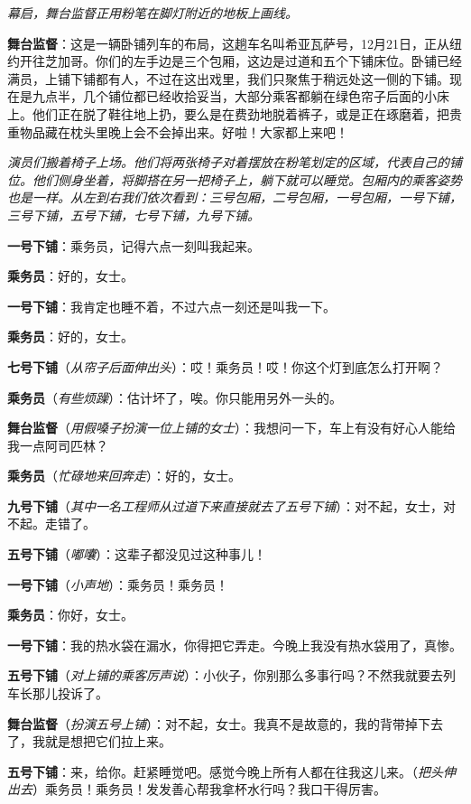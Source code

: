 \documentclass[lang=cn,newtx,12pt,scheme=chinese]{elegantbook}
\begin{document}
\textit{幕启，舞台监督正用粉笔在脚灯附近的地板上画线。}

\textbf{舞台监督}：这是一辆卧铺列车的布局，这趟车名叫希亚瓦萨号，12月21日，正从纽约开往芝加哥。你们的左手边是三个包厢，这边是过道和五个下铺床位。卧铺已经满员，上铺下铺都有人，不过在这出戏里，我们只聚焦于稍远处这一侧的下铺。现在是九点半，几个铺位都已经收拾妥当，大部分乘客都躺在绿色帘子后面的小床上。他们正在脱了鞋往地上扔，要么是在费劲地脱着裤子，或是正在琢磨着，把贵重物品藏在枕头里晚上会不会掉出来。好啦！大家都上来吧！

\textit{演员们搬着椅子上场。他们将两张椅子对着摆放在粉笔划定的区域，代表自己的铺位。他们侧身坐着，将脚搭在另一把椅子上，躺下就可以睡觉。包厢内的乘客姿势也是一样。从左到右我们依次看到：三号包厢，二号包厢，一号包厢，一号下铺，三号下铺，五号下铺，七号下铺，九号下铺。}

\textbf{一号下铺}：乘务员，记得六点一刻叫我起来。

\textbf{乘务员}：好的，女士。

\textbf{一号下铺}：我肯定也睡不着，不过六点一刻还是叫我一下。

\textbf{乘务员}：好的，女士。

\textbf{七号下铺}（\textit{从帘子后面伸出头}）：哎！乘务员！哎！你这个灯到底怎么打开啊？

\textbf{乘务员}（\textit{有些烦躁}）：估计坏了，唉。你只能用另外一头的。

\textbf{舞台监督}（\textit{用假嗓子扮演一位上铺的女士}）：我想问一下，车上有没有好心人能给我一点阿司匹林？

\textbf{乘务员}（\textit{忙碌地来回奔走}）：好的，女士。

\textbf{九号下铺}（\textit{其中一名工程师从过道下来直接就去了五号下铺}）：对不起，女士，对不起。走错了。

\textbf{五号下铺}（\textit{嘟囔}）：这辈子都没见过这种事儿！

\textbf{一号下铺}（\textit{小声地}）：乘务员！乘务员！

\textbf{乘务员}：你好，女士。

\textbf{一号下铺}：我的热水袋在漏水，你得把它弄走。今晚上我没有热水袋用了，真惨。

\textbf{五号下铺}（\textit{对上铺的乘客厉声说}）：小伙子，你别那么多事行吗？不然我就要去列车长那儿投诉了。

\textbf{舞台监督}（\textit{扮演五号上铺}）：对不起，女士。我真不是故意的，我的背带掉下去了，我就是想把它们拉上来。

\textbf{五号下铺}：来，给你。赶紧睡觉吧。感觉今晚上所有人都在往我这儿来。（\textit{把头伸出去}）乘务员！乘务员！发发善心帮我拿杯水行吗？我口干得厉害。
\end{document}
